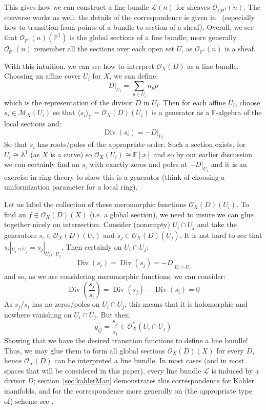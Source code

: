 \documentclass{book}
\newcommand{\A}{{\mathbb{A}}}
\newcommand{\F}{{\mathbb{F}}}
\renewcommand{\P}{{\mathbb{P}}}
\newcommand{\CM}{{\mathcal{M}}}
\newcommand{\CL}{{\mathcal{L}}}
\newcommand{\CO}{{\mathcal{O}}}
\newcommand{\CP}{{\mathbb{C}\mathrm{P}}}
\renewcommand{\div}{{\operatorname{Div}}}
\begin{document}
This gives how we can construct a line bundle $\CL(n)$ for sheaves $\CO_{\CP^1}(n)$. The converse works as
well: the details of the correspondence is given in~\cite[section~4.1]{NateAlgGeo} (especially how to
transition from points of a bundle to section of a sheaf). Overall, we see that $\CO_{\P^1}(n)(\P^1)$ is the
global sections of a line bundle; more generally $\CO_{\P^1}(n)$ remember all the sections over each open set
$U$, as $\CO_{\P^1}(n)$ is a sheaf.

With this intuition, we can see how to interpret $\CO_X(D)$ as a line bundle. Choosing an affine cover $U_i$
for $X$, we can define:
\[
  D|_{U_i} = \sum_{p \in U_i} n_pp
\]
which is the representation of the divisor $D$ in $U_i$. Then for each affine $U_i$, choose $s_i \in \CM_X(U_i)$
so that $\langle s_i \rangle_\F = \CO_X(D)(U_i)$ is a generator as a $\F$-algebra of the local sections and:
\[
  \div(s_i) = -D|_{U_i}
\]
So that $s_i$ has roots/poles of the appropriate order. Such a section exists, for $U_i \cong \A^1$ (as $X$
is a curve) so $\CO_X(U_i) \cong \F[x]$ and so by our earlier discussion we can certainly find an $s_i$ with
exactly zeros and poles at $-D|_{U_i}$ and it is an exercise in ring-theory to show this is a generator (think
of choosing a uniformization parameter for a local ring).

Let us label the collection of these meromorphic functions $\CO_X(D)(U_i)$. To find an $f \in \CO_X(D)(X)$ (i.e.
a global section), we need to insure we can glue together nicely on intersection. Consider (nonempty)
$U_i\cap U_j$ and take the generators $s_i \in \CO_X(D)(U_i)$ and $s_j \in \CO_X(D)(U_j)$. It is not hard to
see that $s_i|_{U_i\cap U_j} =
s_j|_{U_i\cap U_j}$. Then certainly on $U_i\cap U_j$:
\[
  \div(s_i) = \div(s_j) = -D|_{U_i\cap U_j}
\]
and so, as we are considering meromorphic functions, we can consider:
\[
  \div \left(\frac{s_j}{s_i}\right) = \div(s_j) - \div(s_i) = 0
\]
As $s_j/s_i$ has no zeros/poles on $U_i\cap U_j$, this means that it is holomorphic and nowhere vanishing on
$U_i\cap U_j$. But then:
\[
  g_{ij} = \frac{s_j}{s_i} \in \CO_X^*(U_i\cap U_j)
\]
Showing that we have the desired transition functions to define a line bundle! Thus, we may glue them to form
all global sections $\CO_{X}(D)(X)$ for every $D$, hence $\CO_X(D)$ can be interpreted a line bundle. In most
cases (and in most spaces that will be considered in this paper), every line bundle $\CL$ is induced by a
divisor $D$; section~\ref{sec:kahlerMan} demonstrates this correspondence for K\"ahler manifolds, and for the
correspondence more generally on (the appropriate type of) scheme see \cite[section~4.3]{NateAlgGeo}.
\end{document}
